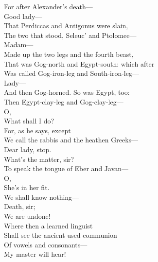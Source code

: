 \documentclass[a4paper,oneside,12pt]{memoir}
\begin{document}
\begin{drama*}
\dolspeaks For after Alexander's death---\\
\mammonspeaks {} Good lady---\\
\dolspeaks That Perdiccas and Antigonus were slain,\\
The two that stood, Seleuc' and Ptolomee---\\
\mammonspeaks Madam---\\
\dolspeaks {} Made up the two legs and the fourth beast,\\
That was Gog-north and Egypt-south: which after\\
Was called Gog-iron-leg and South-iron-leg---\\
\mammonspeaks Lady---\\
\dolspeaks {} And then Gog-horned. So was Egypt, too:\\
Then Egypt-clay-leg and Gog-clay-leg---\\
\mammonspeaks {} O,\\
What shall I do?\\
\dolspeaks {} For, as he says, except\\
We call the rabbis and the heathen Greeks---\\
\mammonspeaks Dear lady, stop.\\
\facespeaks {} What's the matter, sir?\\
\dolspeaks To speak the tongue of Eber and Javan---\\
\mammonspeaks {} O,\\
She's in her fit.\\
\dolspeaks {} We shall know nothing---\\
\facespeaks {} Death, sir;\\
We are undone!\\
\dolspeaks {} Where then a learned linguist\\
Shall see the ancient used communion\\
Of vowels and consonants---\\
\facespeaks {} My master will hear!\\

\end{drama*}
\end{document}
